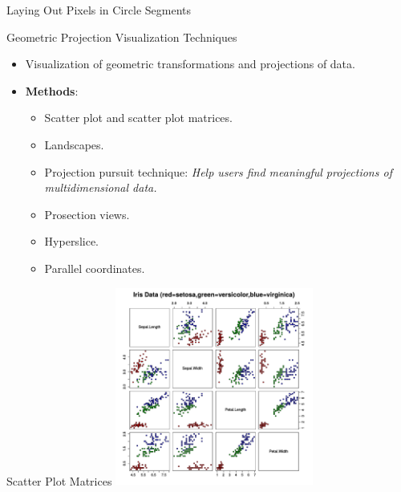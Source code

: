 \begin{frame}{Laying Out Pixels in Circle Segments}
\end{frame}

\begin{frame}{Geometric Projection Visualization Techniques}
  \begin{itemize}
  \item Visualization of geometric transformations and projections of data.
  \item \textbf{Methods}:
    \begin{itemize}
    \item Scatter plot and scatter plot matrices.
    \item Landscapes.
    \item Projection pursuit technique: \emph{Help users find meaningful projections of multidimensional data.}
    \item Prosection views.
    \item Hyperslice.
    \item Parallel coordinates.
    \end{itemize}
  \end{itemize}
\end{frame}

\begin{frame}{Scatter Plot Matrices}
  \centering
  \includegraphics[height=6.5cm]{../img/scatterplot_matrix.pdf}
\end{frame}

